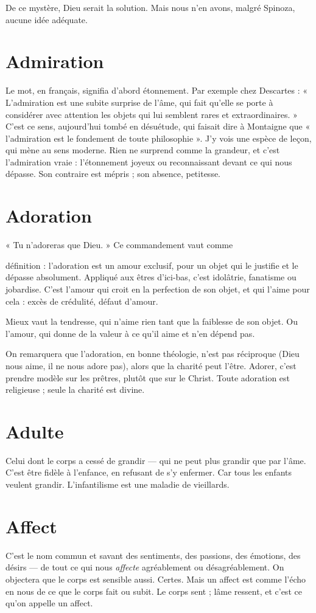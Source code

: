De ce mystère, Dieu serait la solution. Mais nous n’en avons, malgré Spinoza,
aucune idée adéquate.

\section{Admiration}
Le mot, en français, signifia d’abord étonnement. Par exemple
chez Descartes : « L’admiration est une subite surprise de
l’âme, qui fait qu’elle se porte à considérer avec attention les objets qui lui semblent
rares et extraordinaires. » C’est ce sens, aujourd’hui tombé en désuétude,
qui faisait dire à Montaigne que « l'admiration est le fondement de toute
philosophie ». J’y vois une espèce de leçon, qui mène au sens moderne. Rien ne
surprend comme la grandeur, et c’est l’admiration vraie : l’étonnement joyeux
ou reconnaissant devant ce qui nous dépasse.
Son contraire est mépris ; son absence, petitesse.

\section{Adoration}
« Tu n’adoreras que Dieu. » Ce commandement vaut comme

définition : l’adoration est un amour exclusif, pour un objet
qui le justifie et le dépasse absolument. Appliqué aux êtres d’ici-bas, c’est idolâtrie,
fanatisme ou jobardise. C’est l’amour qui croit en la perfection de son
objet, et qui l'aime pour cela : excès de crédulité, défaut d'amour.

Mieux vaut la tendresse, qui n’aime rien tant que la faiblesse de son objet.
Ou l'amour, qui donne de la valeur à ce qu’il aime et n’en dépend pas.

On remarquera que l’adoration, en bonne théologie, n’est pas réciproque
(Dieu nous aime, il ne nous adore pas), alors que la charité peut l’être. Adorer,
c’est prendre modèle sur les prêtres, plutôt que sur le Christ. Toute adoration
est religieuse ; seule la charité est divine.

\section{Adulte}
Celui dont le corps a cessé de grandir — qui ne peut plus grandir
que par l’âme. C’est être fidèle à l'enfance, en refusant de s’y
enfermer. Car tous les enfants veulent grandir. L’infantilisme est une maladie
de vieillards.

\section{Affect}
C’est le nom commun et savant des sentiments, des passions, des
émotions, des désirs — de tout ce qui nous {\it affecte} agréablement ou
désagréablement. On objectera que le corps est sensible aussi. Certes. Mais un
affect est comme l’écho en nous de ce que le corps fait ou subit. Le corps sent ;
lâme ressent, et c’est ce qu’on appelle un affect.

